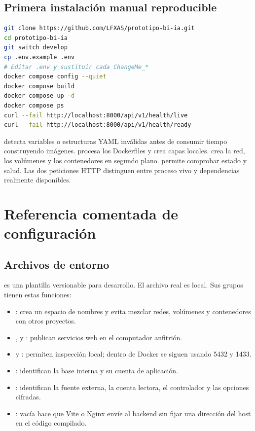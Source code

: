 \subsection{Primera instalación manual reproducible}

\begin{lstlisting}[style=terminal,language=bash]
git clone https://github.com/LFXAS/prototipo-bi-ia.git
cd prototipo-bi-ia
git switch develop
cp .env.example .env
# Editar .env y sustituir cada ChangeMe_*
docker compose config --quiet
docker compose build
docker compose up -d
docker compose ps
curl --fail http://localhost:8000/api/v1/health/live
curl --fail http://localhost:8000/api/v1/health/ready
\end{lstlisting}

 detecta variables o estructuras YAML inválidas antes de consumir tiempo construyendo imágenes.  procesa los Dockerfiles y crea capas locales.  crea la red, los volúmenes y los contenedores en segundo plano.  permite comprobar estado y salud. Las dos peticiones HTTP distinguen entre proceso vivo y dependencias realmente disponibles.

\section{Referencia comentada de configuración}

\subsection{Archivos de entorno}

 es una plantilla versionable para desarrollo. El archivo real  es local. Sus grupos tienen estas funciones:

\begin{itemize}
  \item {}: crea un espacio de nombres y evita mezclar redes, volúmenes y contenedores con otros proyectos.
  \item {},  y : publican servicios web en el computador anfitrión.
  \item {} y : permiten inspección local; dentro de Docker se siguen usando 5432 y 1433.
  \item {}: identifican la base interna y su cuenta de aplicación.
  \item {}: identifican la fuente externa, la cuenta lectora, el controlador y las opciones cifradas.
  \item {}: vacía hace que Vite o Nginx envíe  al backend sin fijar una dirección del host en el código compilado.
\end{itemize}

